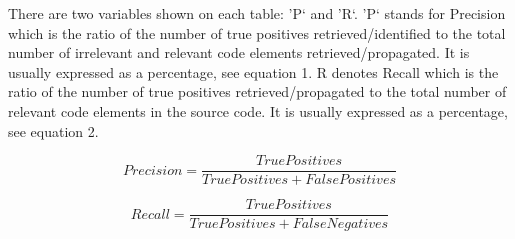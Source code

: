 






 
There are two variables shown on each table: 'P` and 'R`. 'P` stands for Precision which is the ratio of the number of true positives retrieved/identified to the total number of irrelevant and relevant code elements retrieved/propagated. It is usually expressed as a percentage, see equation 1. R denotes Recall which is the ratio of the number of true positives retrieved/propagated to the total number of relevant code elements in the
source code. It is usually expressed as a percentage, see equation 2. 

\begin{equation}
Precision=\frac{True Positives}{True Positives + False Positives}
\end{equation}

\begin{equation}
Recall=\frac{True Positives}{True Positives + False Negatives}
\end{equation}

